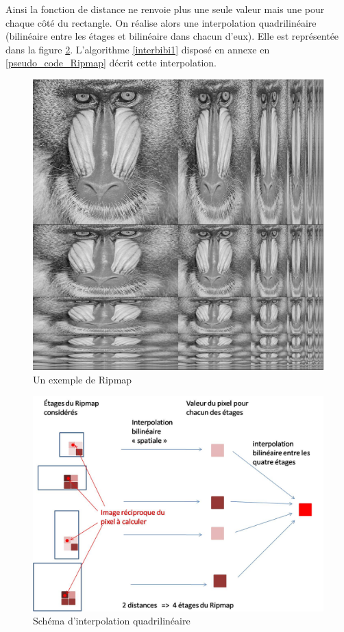 Ainsi la fonction de distance ne renvoie plus une seule valeur mais une pour chaque côté du rectangle. On réalise alors une interpolation quadrilinéaire (bilinéaire entre les étages et bilinéaire dans chacun d'eux). Elle est représentée dans la figure \ref{interbibilineaire}. L'algorithme \ref{interbibi1} disposé en annexe en \ref{pseudo_code_Ripmap} décrit cette interpolation.



\begin{figure}[h!]
\centering
\includegraphics[scale=0.4]{Ripmap_real}
\caption{Un exemple de Ripmap}
\label{Ripmap_real}
\end{figure}


\begin{figure}[h!]
\centering
\includegraphics[scale=0.5]{interbibilineaire.jpg}
\caption{Schéma d'interpolation quadrilinéaire}
\label{interbibilineaire}
\end{figure}


